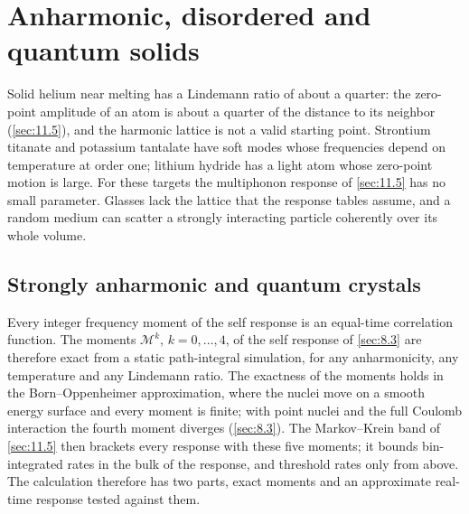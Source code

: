\section{Anharmonic, disordered and quantum solids}\label{app:E.19}

Solid helium near melting has a Lindemann ratio of about a quarter: the zero-point amplitude of an atom is about a quarter of the distance to its neighbor (\cref{sec:11.5}), and the harmonic lattice is not a valid starting point. Strontium titanate and potassium tantalate have soft modes whose frequencies depend on temperature at order one; lithium hydride has a light atom whose zero-point motion is large. For these targets the multiphonon response of \cref{sec:11.5} has no small parameter. Glasses lack the lattice that the response tables assume, and a random medium can scatter a strongly interacting particle coherently over its whole volume.

\subsection{Strongly anharmonic and quantum crystals}

Every integer frequency moment of the self response is an equal-time correlation function. The moments $\mathscr{M}^k$, $k = 0,\dots,4$, of the self response of \cref{sec:8.3} are therefore exact from a static path-integral simulation, for any anharmonicity, any temperature and any Lindemann ratio. The exactness of the moments holds in the Born--Oppenheimer approximation, where the nuclei move on a smooth energy surface and every moment is finite; with point nuclei and the full Coulomb interaction the fourth moment diverges (\cref{sec:8.3}). The Markov--Krein band of \cref{sec:11.5} then brackets every response with these five moments; it bounds bin-integrated rates in the bulk of the response, and threshold rates only from above. The calculation therefore has two parts, exact moments and an approximate real-time response tested against them.

